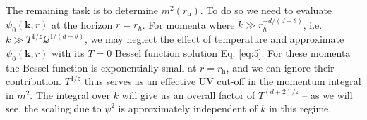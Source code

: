 \documentclass[10pt, oneside]{book}
\begin{document}
\begin{doublespace}
The remaining task is to determine $m^2(r_{\mathrm{h}})$. %
To do so we need to evaluate $\psi_0(\mathbf{k},r)$ at the horizon $r=r_h$. For momenta where $k \gg r_h^{-d/(d-\theta)}$, i.e. $k \gg T^{1/z}\mathcal{Q}^{1/(d-\theta)}$, we may neglect the effect of temperature and approximate $\psi_0(\mathbf{k},r)$ with its $T=0$ Bessel function solution Eq. \eqref{eq:5}. For these momenta the Bessel function is exponentially small at $r=r_{\mathrm{h}}$, and we can ignore their contribution. $T^{1/z}$ thus serves as an effective UV cut-off in the momentum integral in $m^2$.   The integral over $k$ will give us an overall factor of $T^{(d+2)/z}$ -- as we will see, the scaling due to $\psi^2$ is approximately independent of $k$ in this regime.


\end{doublespace}
\end{document}
